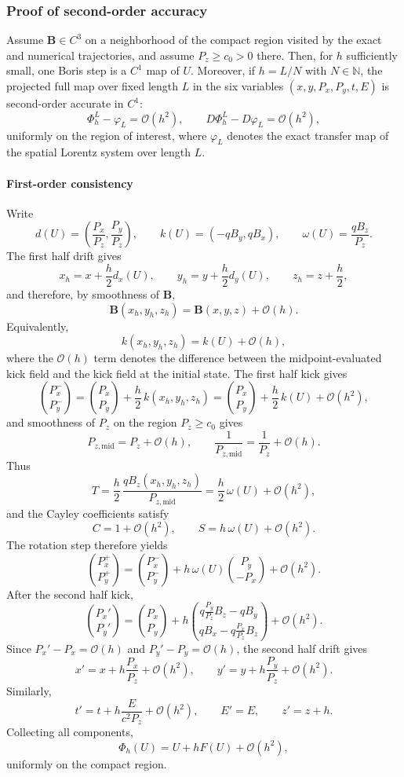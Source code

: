 \subsubsection{Proof of second-order accuracy}
Assume \(\bm B\in C^3\) on a neighborhood of the compact region visited by the
exact and numerical trajectories, and assume \(P_z\ge c_0>0\) there.
Then, for \(h\) sufficiently small, one Boris step is a \(C^1\) map of \(U\).
Moreover, if \(h=L/N\) with \(N\in\mathbb N\), the projected full map over
fixed length \(L\) in the six variables \((x,y,P_x,P_y,t,E)\) is second-order
accurate in \(C^1\):
\begin{equation}
\Phi_h^L-\varphi_L=\mathcal O(h^2),
\qquad
D\Phi_h^L-D\varphi_L=\mathcal O(h^2),
\label{boris:eq:C1_accuracy}
\end{equation}
uniformly on the region of interest, where \(\varphi_L\) denotes the exact
transfer map of the spatial Lorentz system over length \(L\).

\paragraph{First-order consistency}
Write
\[
d(U)=\left(\frac{P_x}{P_z},\frac{P_y}{P_z}\right),\qquad
k(U)=(-qB_y,qB_x),\qquad
\omega(U)=\frac{qB_z}{P_z}.
\]
The first half drift gives
\[
x_h=x+\frac h2 d_x(U),\qquad
y_h=y+\frac h2 d_y(U),\qquad
z_h=z+\frac h2,
\]
and therefore, by smoothness of \(\bm B\),
\[
\bm B(x_h,y_h,z_h)=\bm B(x,y,z)+\mathcal O(h).
\]
Equivalently,
\[
k(x_h,y_h,z_h)=k(U)+\mathcal O(h),
\]
where the \(\mathcal O(h)\) term denotes the difference between the
midpoint-evaluated kick field and the kick field at the initial state.
The first half kick gives
\[
\binom{P_x^-}{P_y^-}
=
\binom{P_x}{P_y}
+ \frac h2\,k(x_h,y_h,z_h)
=
\binom{P_x}{P_y}
+ \frac h2\,k(U) + \mathcal O(h^2),
\]
and smoothness of \(P_z\) on the region \(P_z\ge c_0\) gives
\[
P_{z,\mathrm{mid}}=P_z+\mathcal O(h),
\qquad
\frac{1}{P_{z,\mathrm{mid}}}=\frac{1}{P_z}+\mathcal O(h).
\]
Thus
\[
T
=
\frac{h}{2}\,\frac{qB_z(x_h,y_h,z_h)}{P_{z,\mathrm{mid}}}
=
\frac h2\,\omega(U)+\mathcal O(h^2),
\]
and the Cayley coefficients satisfy
\[
C=1+\mathcal O(h^2),\qquad S=h\,\omega(U)+\mathcal O(h^2).
\]
The rotation step therefore yields
\[
\binom{P_x^+}{P_y^+}
=
\binom{P_x^-}{P_y^-}
+ h\,\omega(U)
\binom{P_y}{-P_x}
+ \mathcal O(h^2).
\]
After the second half kick,
\[
\binom{P_x'}{P_y'}
=
\binom{P_x}{P_y}
+ h
\binom{q\frac{P_y}{P_z}B_z-qB_y}{qB_x-q\frac{P_x}{P_z}B_z}
+ \mathcal O(h^2).
\]
Since \(P_x'-P_x=\mathcal O(h)\) and \(P_y'-P_y=\mathcal O(h)\), the second
half drift gives
\[
x'=x+h\frac{P_x}{P_z}+\mathcal O(h^2),\qquad
y'=y+h\frac{P_y}{P_z}+\mathcal O(h^2).
\]
Similarly,
\[
t'=t+h\frac{E}{c^2P_z}+\mathcal O(h^2),
\qquad
E'=E,
\qquad
z'=z+h.
\]
Collecting all components,
\begin{equation}
\Phi_h(U)=U+hF(U)+\mathcal O(h^2),
\label{boris:eq:first_order_consistency}
\end{equation}
uniformly on the compact region.

